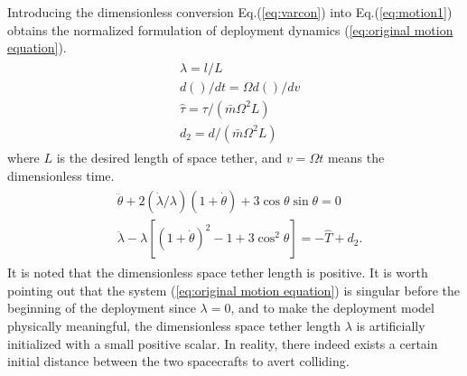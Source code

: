 \documentclass[ShortAfour]{sage}
\theoremstyle{plain}
\theoremstyle{remark}
\begin{document}
Introducing the dimensionless conversion Eq.(\ref{eq:varcon}) into Eq.(\ref{eq:motion1}) obtains the normalized formulation of deployment dynamics (\ref{eq:original motion equation}).
\begin{align}
\begin{split}
&\lambda=l/L\\
&d()/dt=\Omega d()/dv\\
&\hat{\tau}=\tau/(\bar{m}\Omega^2L)\\
&d_2 = d/(\bar{m}\Omega^2L)\label{eq:varcon}
\end{split}
\end{align}
where $L$ is the desired length of space tether, and $v = \Omega t$ means the dimensionless time.
\begin{align}\begin{split}
  &\ddot\theta+2\left(\dot\lambda/\lambda\right)\left(1+\dot\theta\right)+3\cos\theta\sin\theta=0\\
  &\ddot\lambda-\lambda\left[\left(1+\dot\theta\right)^2-1+3\cos^2\theta\right]=-\hat T+d_2\label{eq:original motion equation}.
\end{split}\end{align}
It is noted that the dimensionless space tether length is positive. It is worth pointing out that the system (\ref{eq:original motion equation}) is singular before the beginning of the deployment since $\lambda = 0$, and to make the deployment model physically meaningful, the dimensionless space tether length $\lambda$ is artificially initialized with a small positive scalar. In reality, there indeed exists a certain initial distance between the two spacecrafts to avert colliding.
\end{document}
